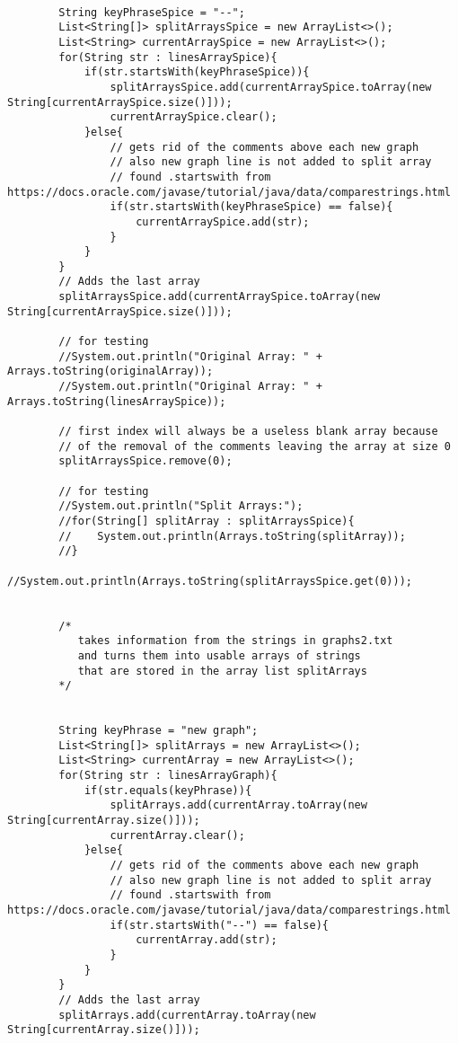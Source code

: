 \documentclass[10pt]{article}
\begin{document}
\begin{lstlisting}[frame=single, ]
        
        String keyPhraseSpice = "--";
        List<String[]> splitArraysSpice = new ArrayList<>();
        List<String> currentArraySpice = new ArrayList<>();
        for(String str : linesArraySpice){
            if(str.startsWith(keyPhraseSpice)){
                splitArraysSpice.add(currentArraySpice.toArray(new String[currentArraySpice.size()]));
                currentArraySpice.clear();
            }else{
                // gets rid of the comments above each new graph
                // also new graph line is not added to split array
                // found .startswith from https://docs.oracle.com/javase/tutorial/java/data/comparestrings.html
                if(str.startsWith(keyPhraseSpice) == false){
                    currentArraySpice.add(str);
                }
            }
        }
        // Adds the last array
        splitArraysSpice.add(currentArraySpice.toArray(new String[currentArraySpice.size()]));

        // for testing
        //System.out.println("Original Array: " + Arrays.toString(originalArray));
        //System.out.println("Original Array: " + Arrays.toString(linesArraySpice));

        // first index will always be a useless blank array because
        // of the removal of the comments leaving the array at size 0
        splitArraysSpice.remove(0);

        // for testing
        //System.out.println("Split Arrays:");
        //for(String[] splitArray : splitArraysSpice){
        //    System.out.println(Arrays.toString(splitArray));
        //}
        //System.out.println(Arrays.toString(splitArraysSpice.get(0)));


        /*
           takes information from the strings in graphs2.txt
           and turns them into usable arrays of strings
           that are stored in the array list splitArrays
        */

        
        String keyPhrase = "new graph";
        List<String[]> splitArrays = new ArrayList<>();
        List<String> currentArray = new ArrayList<>();
        for(String str : linesArrayGraph){
            if(str.equals(keyPhrase)){
                splitArrays.add(currentArray.toArray(new String[currentArray.size()]));
                currentArray.clear();
            }else{
                // gets rid of the comments above each new graph
                // also new graph line is not added to split array
                // found .startswith from https://docs.oracle.com/javase/tutorial/java/data/comparestrings.html
                if(str.startsWith("--") == false){
                    currentArray.add(str);
                }
            }
        }
        // Adds the last array
        splitArrays.add(currentArray.toArray(new String[currentArray.size()]));


\end{lstlisting}
\end{document}
